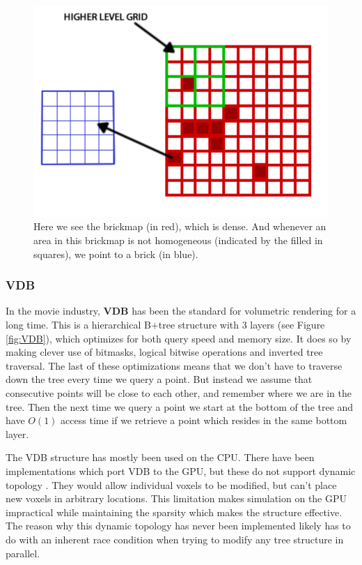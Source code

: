\begin{figure}[H]
    \centering
    \includegraphics[width=0.9\linewidth]{figures/brickmap.png}
    \caption{Here we see the brickmap (in red), which is dense. And whenever an area in this brickmap is not homogeneous (indicated by the filled in squares), we point to a brick (in blue). \cite{van2015real}}
    \label{fig:brickmap}
\end{figure}
\subsubsection{VDB} \label{introduction:voxel_data_structures:vdb}
In the movie industry, \textbf{VDB} \cite{museth2013vdb} has been the standard for volumetric rendering for a long time. This is a hierarchical B+tree structure with 3 layers (see Figure \ref{fig:VDB}), which optimizes for both query speed and memory size. It does so by making clever use of bitmasks, logical bitwise operations and inverted tree traversal. The last of these optimizations means that we don't have to traverse down the tree every time we query a point. But instead we assume that consecutive points will be close to each other, and remember where we are in the tree. Then the next time we query a point we start at the bottom of the tree and have $O(1)$ access time if we retrieve a point which resides in the same bottom layer.

The VDB structure has mostly been used on the CPU. There have been implementations which port VDB to the GPU, but these do not support dynamic topology \cite{hoetzlein2016gvdb} \cite{museth2021nanovdb}. They would allow individual voxels to be modified, but can't place new voxels in arbitrary locations. This limitation makes simulation on the GPU impractical while maintaining the sparsity which makes the structure effective. The reason why this dynamic topology has never been implemented likely has to do with an inherent race condition when trying to modify any tree structure in parallel.

